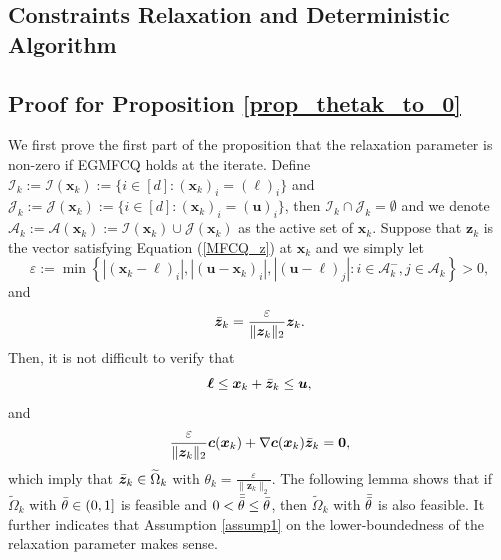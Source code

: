 \documentclass[aos]{imsart}
\numberwithin{equation}{section}
\theoremstyle{plain}
\begin{document}

\begin{appendix}
\newpage
\section{Constraints Relaxation and Deterministic Algorithm}
\label{sec:appendix1}
\subsection{Proof for Proposition \ref{prop_thetak_to_0}}
\label{sec:appendix1.1}
We first prove the first part of the proposition that the relaxation parameter is non-zero if EGMFCQ holds at the iterate. Define $\mathcal{I}_k := \mathcal{I}(\bm{x}_k):= \{ i \in [d]: (\bm{x}_k)_i = (\bm{\ell})_i \}$ and  $\mathcal{J}_k := \mathcal{J}(\bm{x}_k):= \{ i \in [d]: (\bm{x}_k)_i = (\bm{u})_i \}$, then $\mathcal{I}_k \cap \mathcal{J}_k = \emptyset$ and we denote $\mathcal{A}_k := \mathcal{A}(\bm{x}_k) := \mathcal{I}(\bm{x}_k) \cup \mathcal{J}(\bm{x}_k)$ as the active set of $\bm{x}_k$. Suppose that $\bm{z}_k$ is the vector satisfying Equation (\ref{MFCQ_z}) at $\bm{x}_k$ and we simply let 
$$\varepsilon := \min\left\{\left|(\bm{x}_k - \bm{\ell})_{i}\right|, \left|(\bm{u} -\bm{x}_k)_{i}\right| , \left|(\bm{u} - \bm{\ell})_{j}\right| : i \in \mathcal{A}_k^{-}, j \in \mathcal{A}_k\right\}>0,$$
and
\begin{equation*}
    \Bar{\bm{z}}_k = \frac{\varepsilon}{\|\bm{z}_k\|_2} \bm{z}_k.
\end{equation*}
Then, it is not difficult to verify that 
\begin{equation*}
    \bm{\ell} \leq \bm{x}_k + \Bar{\bm{z}}_k \leq \bm{u},
\end{equation*}
and
\begin{equation}
\label{construct_theta_k}
    \frac{\varepsilon}{\|\bm{z}_k\|_2} \bm{c}(\bm{x}_k) + \nabla \bm{c}(\bm{x}_k) \Bar{\bm{z}}_k = \bm{0},
\end{equation}
which imply that $\Bar{\bm{z}}_k \in \widetilde{\Omega}_k$ with $\theta_k = \frac{\varepsilon}{\|\bm{z}_k\|_2}$. The following lemma shows that if $\widetilde{\Omega}_k$ with $\Bar{\theta} \in (0,1]$ is feasible and $0<\Bar{\Bar{\theta}} \leq \Bar{\theta}$, then $\widetilde{\Omega}_k$ with $\Bar{\Bar{\theta}}$ is also feasible. It further indicates that Assumption \ref{assump1} on the lower-boundedness of the relaxation parameter makes sense. 



\end{appendix}
\end{document}
